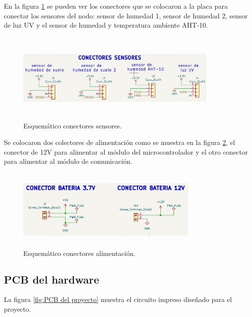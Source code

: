 En la figura \ref{fig:esquematico conectores sensores} se pueden ver los conectores que se colocaron a la placa para conectar los sensores del nodo: sensor de humedad 1, sensor de humedad 2, sensor de luz UV y el sensor de humedad y temperatura ambiente AHT-10.
\begin{figure}[h]
  \centering
	\includegraphics[width=10cm, height=4.5cm]{./Figures/conectores_sensores.png}
	\caption{Esquemático conectores sensores.}
	\label{fig:esquematico conectores sensores}
\end{figure}

Se colocaron dos colectores de alimentación como se muestra en la figura \ref{fig:esquematico conectores alimentacion}, el conector de 12V para alimentar al módulo del microcontrolador y el otro conector para alimentar al módulo de comunicación.
\begin{figure}[h]
  \centering
	\includegraphics[width=9cm, height=4cm]{./Figures/esquematico_alimentacion.png}
	\caption{Esquemático conectores alimentación.}
	\label{fig:esquematico conectores alimentacion}
\end{figure}

\subsection{PCB del hardware} 
La figura \ref{fig:PCB del proyecto} muestra el circuito impreso diseñado para el proyecto.

